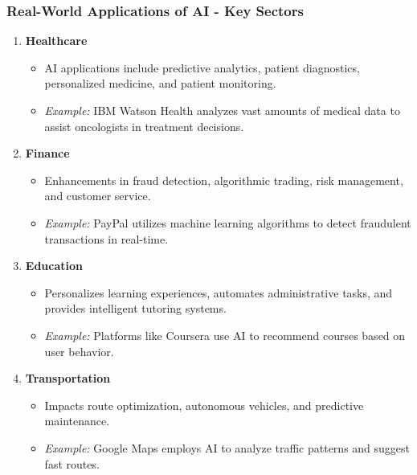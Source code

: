 \documentclass[aspectratio=169]{beamer}
\begin{document}
\begin{frame}[fragile]
    \frametitle{Real-World Applications of AI - Key Sectors}
    \begin{enumerate}
        \item \textbf{Healthcare}
            \begin{itemize}
                \item AI applications include predictive analytics, patient diagnostics, personalized medicine, and patient monitoring.
                \item \textit{Example:} IBM Watson Health analyzes vast amounts of medical data to assist oncologists in treatment decisions.
            \end{itemize}

        \item \textbf{Finance}
            \begin{itemize}
                \item Enhancements in fraud detection, algorithmic trading, risk management, and customer service.
                \item \textit{Example:} PayPal utilizes machine learning algorithms to detect fraudulent transactions in real-time.
            \end{itemize}

        \item \textbf{Education}
            \begin{itemize}
                \item Personalizes learning experiences, automates administrative tasks, and provides intelligent tutoring systems.
                \item \textit{Example:} Platforms like Coursera use AI to recommend courses based on user behavior.
            \end{itemize}
        
        \item \textbf{Transportation}
            \begin{itemize}
                \item Impacts route optimization, autonomous vehicles, and predictive maintenance.
                \item \textit{Example:} Google Maps employs AI to analyze traffic patterns and suggest fast routes.
            \end{itemize}
    \end{enumerate}
\end{frame}
\end{document}
